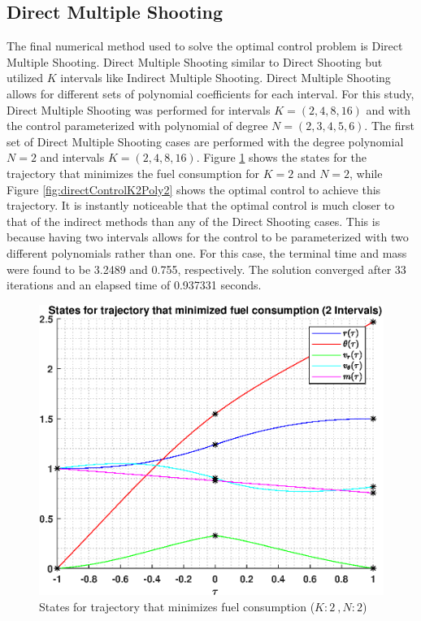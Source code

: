 \documentclass[]{article}
\begin{document}
\subsection{Direct Multiple Shooting}
The final numerical method used to solve the optimal control problem is Direct Multiple Shooting. Direct Multiple Shooting similar to Direct Shooting but utilized \(K\) intervals like Indirect Multiple Shooting. Direct Multiple Shooting allows for different sets of polynomial coefficients for each interval. For this study, Direct Multiple Shooting was performed for intervals \(K = (2,4,8,16)\) and with the control parameterized with polynomial of degree \(N = (2,3,4,5,6)\).
\vspace{2mm}\newline 
The first set of Direct Multiple Shooting cases are performed with the degree polynomial \(N = 2\) and intervals \(K = (2,4,8,16)\). Figure \ref{fig:directStatesK2Poly2} shows the states for the trajectory that minimizes the fuel consumption for \(K = 2\) and  \(N = 2\), while Figure \ref{fig:directControlK2Poly2} shows the optimal control to achieve this trajectory. It is instantly noticeable that the optimal control is much closer to that of the indirect methods than any of the Direct Shooting cases. This is because having two intervals allows for the control to be parameterized with two different polynomials rather than one. For this case, the terminal time and mass were found to be 3.2489 and 0.755, respectively. The solution converged after 33 iterations and an elapsed time of 0.937331 seconds.
\begin{figure}
	\centering
	\includegraphics[scale=0.75]{directStatesK2Poly2.eps}
	\caption{States for trajectory that minimizes fuel consumption (\(K:2\ , N:2\))}
	\label{fig:directStatesK2Poly2}
\end{figure}
\end{document}
